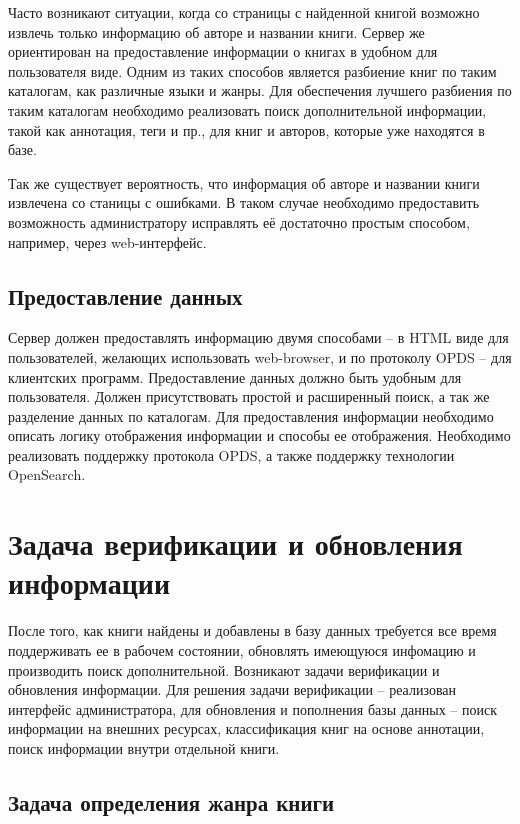 \documentclass[a4paper]{report}
\begin{document}
Часто возникают ситуации, когда со страницы с найденной книгой возможно извлечь только информацию об авторе и названии книги. Сервер же ориентирован на предоставление информации о книгах в удобном для пользователя виде. Одним из таких способов является разбиение книг по таким каталогам, как различные языки и жанры. Для обеспечения лучшего разбиения по таким каталогам необходимо реализовать поиск дополнительной информации, такой как аннотация, теги и пр., для книг и авторов, которые уже находятся в базе.


Так же существует вероятность, что информация об авторе и названии книги извлечена со станицы с ошибками. В таком случае необходимо предоставить возможность администратору исправлять её достаточно простым способом, например, через web-интерфейс.


\subsection{Предоставление данных}

Сервер должен предоставлять информацию двумя способами -- в HTML виде для пользователей, желающих использовать web-browser, и по протоколу OPDS -- для клиентских программ. Предоставление данных должно быть удобным для пользователя. Должен присутствовать простой и расширенный поиск, а так же разделение данных по каталогам. Для предоставления информации необходимо описать логику отображения информации и способы ее отображения. Необходимо реализовать поддержку протокола OPDS, а также поддержку технологии OpenSearch.


\section{Задача верификации и обновления информации}

После того, как книги найдены и добавлены в базу данных требуется все время поддерживать ее в рабочем состоянии, обновлять имеющуюся инфомацию и производить поиск дополнительной. Возникают задачи верификации и обновления информации. Для решения задачи верификации -- реализован интерфейс администратора, для обновления и пополнения базы данных -- поиск информации на внешних ресурсах, классификация книг на основе аннотации, поиск информации внутри отдельной книги.

\subsection{Задача определения жанра книги}
\end{document}
